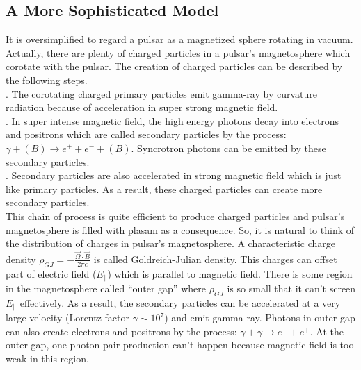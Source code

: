 \documentclass[12pt]{report}
\begin{document}
        \subsection{A More Sophisticated Model}
              It is oversimplified to regard a pulsar as a magnetized sphere rotating in vacuum. Actually,
              there are plenty of 
              charged particles in a pulsar's magnetosphere which corotate with the pulsar. The creation of 
              charged particles can 
              be described by the following steps. \\
              . The corotating charged primary particles emit gamma-ray by curvature radiation 
              because of acceleration in super strong magnetic field.  \\
              . In super intense magnetic field,  the high energy photons decay into electrons and 
              positrons which are called secondary particles by the process: 
              $\gamma + (B) \rightarrow e^++e^-+(B)$. Syncrotron 
                                  photons can be emitted by these secondary particles. \\
              . Secondary particles are also accelerated in strong magnetic field which is just like 
              primary particles. As a result, these charged particles can create more secondary particles. \\
              \indent This chain of process is quite efficient to produce charged particles and pulsar's 
              magnetosphere is filled with plasam as a consequence. So, it is natural to think of the 
              distribution of charges in pulsar's magnetosphere. A characteristic charge density 
              $\rho_{GJ}=-\frac{\vec{\Omega}\cdot \vec{B}}{2\pi c}$ is called Goldreich-Julian density. 
              This charges can offset part of electric field ($E_{\parallel}$) which is parallel to magnetic 
              field. There is some region in the magnetosphere called ``outer gap'' where $\rho_{GJ}$ is so 
              small that it can't screen $E_{\parallel}$ effectively. As a result, the secondary particles can 
              be accelerated at a very large velocity (Lorentz factor $\gamma\sim 10^7$) and emit gamma-ray. 
              Photons in outer gap can also create electrons and positrons by the process: 
              $\gamma+\gamma\rightarrow e^-+e^+$. At the outer gap, one-photon pair production can't happen 
              because magnetic field is too weak in this region.
            
\end{document}
